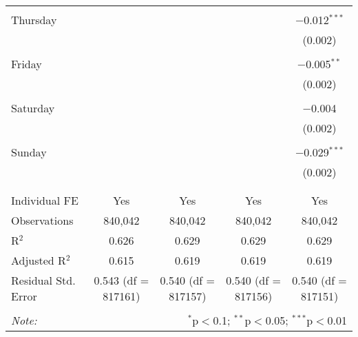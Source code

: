 \documentclass[
]{article}
\begin{document}
\begin{table}[!htbp]
{\begin{tabular}{@{\extracolsep{5pt}}lcccc}
  & & & & \\ 
 Thursday &  &  &  & $-$0.012$^{***}$ \\ 
  &  &  &  & (0.002) \\ 
  & & & & \\ 
 Friday &  &  &  & $-$0.005$^{**}$ \\ 
  &  &  &  & (0.002) \\ 
  & & & & \\ 
 Saturday &  &  &  & $-$0.004 \\ 
  &  &  &  & (0.002) \\ 
  & & & & \\ 
 Sunday &  &  &  & $-$0.029$^{***}$ \\ 
  &  &  &  & (0.002) \\ 
  & & & & \\ 
\hline \\[-1.8ex] 
Individual FE & Yes & Yes & Yes & Yes \\ 
Observations & 840,042 & 840,042 & 840,042 & 840,042 \\ 
R$^{2}$ & 0.626 & 0.629 & 0.629 & 0.629 \\ 
Adjusted R$^{2}$ & 0.615 & 0.619 & 0.619 & 0.619 \\ 
Residual Std. Error & 0.543 (df = 817161) & 0.540 (df = 817157) & 0.540 (df = 817156) & 0.540 (df = 817151) \\ 
\hline 
\hline \\[-1.8ex] 
\textit{Note:}  & \multicolumn{4}{r}{$^{*}$p$<$0.1; $^{**}$p$<$0.05; $^{***}$p$<$0.01} \\ 
\end{tabular}
} 
\end{table} 
\newpage
\end{document}
